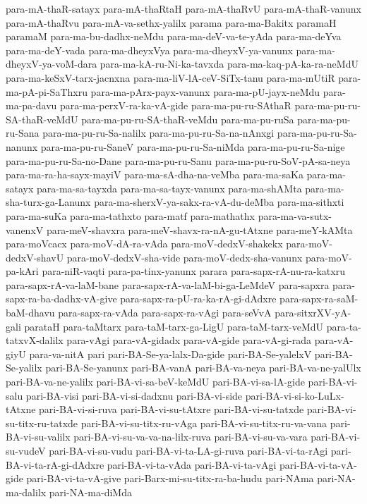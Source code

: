 {para-mA-thaR-satayx
para-mA-thaRtaH
para-mA-thaRvU
para-mA-thaR-vanunx
para-mA-thaRvu
para-mA-va-sethx-yalilx
parama
para-ma-Bakitx
paramaH
paramaM
para-ma-bu-dadhx-neMdu
para-ma-deV-va-te-yAda
para-ma-deYva
para-ma-deY-vada
para-ma-dheyxVya
para-ma-dheyxV-ya-vanunx
para-ma-dheyxV-ya-voM-dara
para-ma-kA-ru-Ni-ka-tavxda
para-ma-kaq-pA-ka-ra-neMdU
para-ma-keSxV-tarx-jacnxna
para-ma-liV-lA-ceV-SiTx-tanu
para-ma-mUtiR
para-ma-pA-pi-SaThxru
para-ma-pArx-payx-vanunx
para-ma-pU-jayx-neMdu
para-ma-pa-davu
para-ma-perxV-ra-ka-vA-gide
para-ma-pu-ru-SAthaR
para-ma-pu-ru-SA-thaR-veMdU
para-ma-pu-ru-SA-thaR-veMdu
para-ma-pu-ruSa
para-ma-pu-ru-Sana
para-ma-pu-ru-Sa-nalilx
para-ma-pu-ru-Sa-na-nAnxgi
para-ma-pu-ru-Sa-nanunx
para-ma-pu-ru-SaneV
para-ma-pu-ru-Sa-niMda
para-ma-pu-ru-Sa-nige
para-ma-pu-ru-Sa-no-Dane
para-ma-pu-ru-Sanu
para-ma-pu-ru-SoV-pA-sa-neya
para-ma-ra-ha-sayx-mayiV
para-ma-sA-dha-na-veMba
para-ma-saKa
para-ma-satayx
para-ma-sa-tayxda
para-ma-sa-tayx-vanunx
para-ma-shAMta
para-ma-sha-turx-ga-Lanunx
para-ma-sherxV-ya-sakx-ra-vA-du-deMba
para-ma-sithxti
para-ma-suKa
para-ma-tathxto
para-matf
para-mathathx
para-ma-va-sutx-vanenxV
para-meV-shavxra
para-meV-shavx-ra-nA-gu-tAtxne
para-meY-kAMta
para-moVcacx
para-moV-dA-ra-vAda
para-moV-dedxV-shakekx
para-moV-dedxV-shavU
para-moV-dedxV-sha-vide
para-moV-dedx-sha-vanunx
para-moV-pa-kAri
para-niR-vaqti
para-pa-tinx-yanunx
parara
para-sapx-rA-nu-ra-katxru
para-sapx-rA-va-laM-bane
para-sapx-rA-va-laM-bi-ga-LeMdeV
para-sapxra
para-sapx-ra-ba-dadhx-vA-give
para-sapx-ra-pU-ra-ka-rA-gi-dAdxre
para-sapx-ra-saM-baM-dhavu
para-sapx-ra-vAda
para-sapx-ra-vAgi
para-seVvA
para-sitxrXV-yA-gali
parataH
para-taMtarx
para-taM-tarx-ga-LigU
para-taM-tarx-veMdU
para-ta-tatxvX-dalilx
para-vAgi
para-vA-gidadx
para-vA-gide
para-vA-gi-rada
para-vA-giyU
para-va-nitA
pari
pari-BA-Se-ya-lalx-Da-gide
pari-BA-Se-yalelxV
pari-BA-Se-yalilx
pari-BA-Se-yanunx
pari-BA-vanA
pari-BA-va-neya
pari-BA-va-ne-yalUlx
pari-BA-va-ne-yalilx
pari-BA-vi-sa-beV-keMdU
pari-BA-vi-sa-lA-gide
pari-BA-vi-salu
pari-BA-visi
pari-BA-vi-si-dadxnu
pari-BA-vi-side
pari-BA-vi-si-ko-LuLx-tAtxne
pari-BA-vi-si-ruva
pari-BA-vi-su-tAtxre
pari-BA-vi-su-tatxde
pari-BA-vi-su-titx-ru-tatxde
pari-BA-vi-su-titx-ru-vAga
pari-BA-vi-su-titx-ru-va-vana
pari-BA-vi-su-valilx
pari-BA-vi-su-va-va-na-lilx-ruva
pari-BA-vi-su-va-vara
pari-BA-vi-su-vudeV
pari-BA-vi-su-vudu
pari-BA-vi-ta-LA-gi-ruva
pari-BA-vi-ta-rAgi
pari-BA-vi-ta-rA-gi-dAdxre
pari-BA-vi-ta-vAda
pari-BA-vi-ta-vAgi
pari-BA-vi-ta-vA-gide
pari-BA-vi-ta-vA-give
pari-Barx-mi-su-titx-ra-ba-hudu
pari-NAma
pari-NA-ma-dalilx
pari-NA-ma-diMda
}

